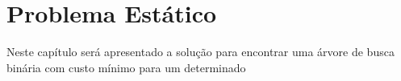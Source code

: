 
\chapter{Problema Estático}
\label{cap:problema-estatico}

Neste capítulo será apresentado a solução para encontrar uma árvore de busca binária com custo mínimo para um determinado 